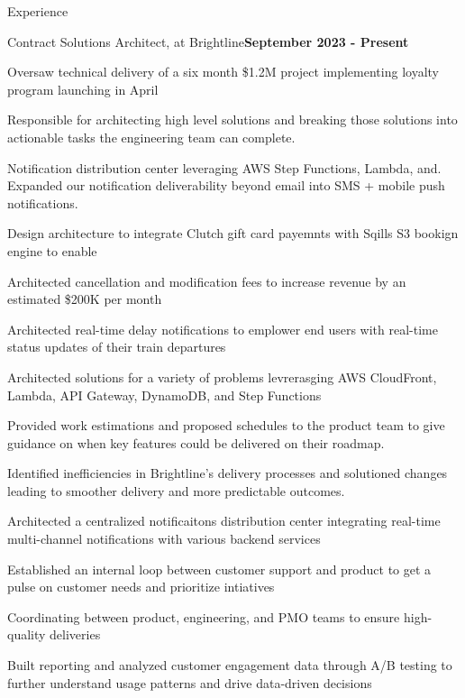 \documentclass{resume} %
\begin{document}
\begin{rSection}{Experience}


    \begin{rSubsection}{Contract Solutions Architect, at Brightline}{\bf September 2023 - Present}{}{}

    \item Oversaw technical delivery of a six month \$1.2M project implementing loyalty program launching in April
    \item Responsible for architecting high level solutions and breaking those solutions into actionable tasks the engineering team can complete.        
    \item Notification distribution center leveraging AWS Step Functions, Lambda, and. Expanded our notification deliverability beyond email into SMS + mobile push notifications.
    \item Design architecture to integrate Clutch gift card payemnts with Sqills S3 bookign engine to enable 
    \item Architected cancellation and modification fees to increase revenue by an estimated \$200K per month
    \item Architected real-time delay notifications to emplower end users with real-time status updates of their train departures
    \item Architected solutions for a variety of problems levrerasging AWS CloudFront, Lambda, API Gateway, DynamoDB, and Step Functions
    \item Provided work estimations and proposed schedules to the product team to give guidance on when key features could be delivered on their roadmap.    
    \item Identified inefficiencies in Brightline's delivery processes and solutioned changes leading to smoother delivery and more predictable outcomes.
    \item Architected a centralized notificaitons distribution center integrating real-time multi-channel notifications with various backend services
    \item Established an internal loop between customer support and product to get a pulse on customer needs and prioritize intiatives
    \item Coordinating between product, engineering, and PMO teams to ensure high-quality deliveries
    \item Built reporting and analyzed customer engagement data through A/B testing to further understand usage patterns and drive data-driven decisions


\end{rSubsection}
\end{rSection}
\end{document}
